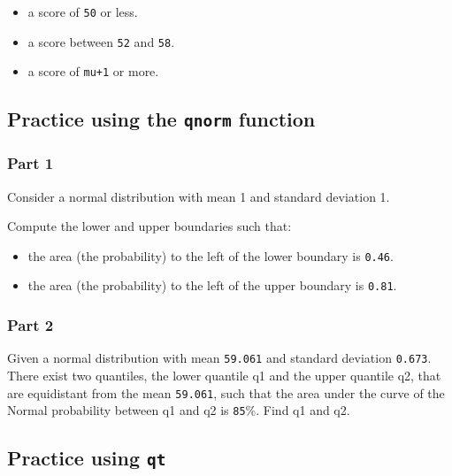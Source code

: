 \documentclass[12pt,]{krantz}
\providecommand{\tightlist}{%
  \setlength{\itemsep}{0pt}\setlength{\parskip}{0pt}}
\begin{document}
\begin{itemize}
\tightlist
\item
  a score of \texttt{50} or less.
\item
  a score between \texttt{52} and \texttt{58}.
\item
  a score of \texttt{mu+1} or more.
\end{itemize}

\hypertarget{sec:Foundationsexercisesqnorm}{%
\subsection{\texorpdfstring{Practice using the \texttt{qnorm} function}{Practice using the qnorm function}}\label{sec:Foundationsexercisesqnorm}}

\hypertarget{sec:FoundationsexercisesqnormPart1}{%
\subsubsection{Part 1}\label{sec:FoundationsexercisesqnormPart1}}

Consider a normal distribution with mean 1 and standard deviation 1.

Compute the lower and upper boundaries such that:

\begin{itemize}
\tightlist
\item
  the area (the probability) to the left of the lower boundary is \texttt{0.46}.
\item
  the area (the probability) to the left of the upper boundary is \texttt{0.81}.
\end{itemize}

\hypertarget{sec:FoundationsexercisesqnormPart2}{%
\subsubsection{Part 2}\label{sec:FoundationsexercisesqnormPart2}}

Given a normal distribution with mean \texttt{59.061} and standard deviation \texttt{0.673}. There exist two quantiles, the lower quantile q1 and the upper quantile q2, that are equidistant from the mean \texttt{59.061}, such that the area under the curve of the Normal probability between q1 and q2 is \texttt{85}\%. Find q1 and q2.

\hypertarget{sec:Foundationsexercisesqt}{%
\subsection{\texorpdfstring{Practice using \texttt{qt}}{Practice using qt}}\label{sec:Foundationsexercisesqt}}
\end{document}
